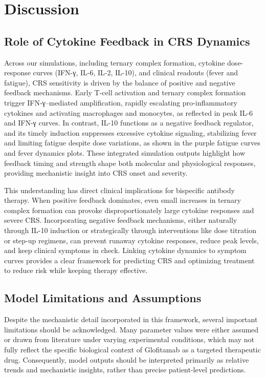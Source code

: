 \documentclass[11pt]{article}
\begin{document}
\section{Discussion}

\subsection{Role of Cytokine Feedback in CRS Dynamics}

Across our simulations, including ternary complex formation, cytokine dose-response curves (IFN-γ, IL-6, IL-2, IL-10), and clinical readouts (fever and fatigue), CRS sensitivity is driven by the balance of positive and negative feedback mechanisms. Early T-cell activation and ternary complex formation trigger IFN-γ–mediated amplification, rapidly escalating pro-inflammatory cytokines and activating macrophages and monocytes, as reflected in peak IL-6 and IFN-γ curves. In contrast, IL-10 functions as a negative feedback regulator, and its timely induction suppresses excessive cytokine signaling, stabilizing fever and limiting fatigue despite dose variations, as shown in the purple fatigue curves and fever dynamics plots. These integrated simulation outputs highlight how feedback timing and strength shape both molecular and physiological responses, providing mechanistic insight into CRS onset and severity.
\par\medskip

This understanding has direct clinical implications for bispecific antibody therapy. When positive feedback dominates, even small increases in ternary complex formation can provoke disproportionately large cytokine responses and severe CRS. Incorporating negative feedback mechanisms, either naturally through IL-10 induction or strategically through interventions like dose titration or step-up regimens, can prevent runaway cytokine responses, reduce peak levels, and keep clinical symptoms in check. Linking cytokine dynamics to symptom curves provides a clear framework for predicting CRS and optimizing treatment to reduce risk while keeping therapy effective.
\par\medskip

\subsection{Model Limitations and Assumptions}

Despite the mechanistic detail incorporated in this framework, several important limitations should be acknowledged. Many parameter values were either assumed or drawn from literature under varying experimental conditions, which may not fully reflect the specific biological context of Glofitamab as a targeted therapeutic drug. Consequently, model outputs should be interpreted primarily as relative trends and mechanistic insights, rather than precise patient-level predictions.
\par\medskip
\end{document}
